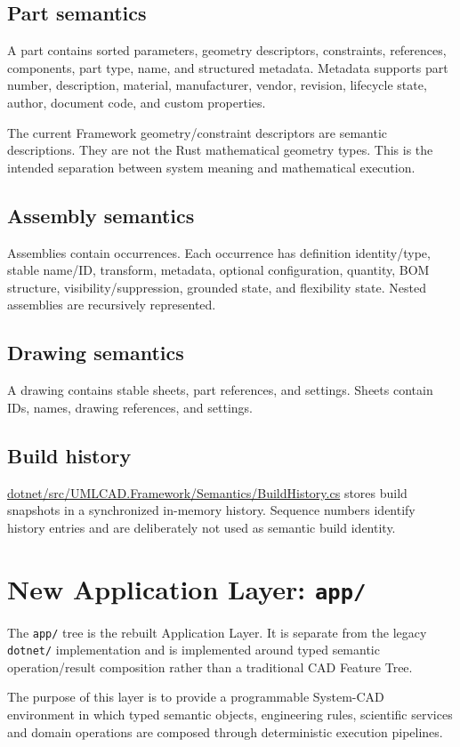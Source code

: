 \documentclass[11pt,a4paper]{report}
\newcommand{\pathref}[1]{\url{#1}}
\begin{document}
\section{Part semantics}
A part contains sorted parameters, geometry descriptors, constraints, references, components, part type, name, and structured metadata. Metadata supports part number, description, material, manufacturer, vendor, revision, lifecycle state, author, document code, and custom properties.

The current Framework geometry/constraint descriptors are semantic descriptions. They are not the Rust mathematical geometry types. This is the intended separation between system meaning and mathematical execution.

\section{Assembly semantics}
Assemblies contain occurrences. Each occurrence has definition identity/type, stable name/ID, transform, metadata, optional configuration, quantity, BOM structure, visibility/suppression, grounded state, and flexibility state. Nested assemblies are recursively represented.

\section{Drawing semantics}
A drawing contains stable sheets, part references, and settings. Sheets contain IDs, names, drawing references, and settings.

\section{Build history}
\pathref{dotnet/src/UMLCAD.Framework/Semantics/BuildHistory.cs} stores build snapshots in a synchronized in-memory history. Sequence numbers identify history entries and are deliberately not used as semantic build identity.

\chapter{New Application Layer: \texttt{app/}}

The \texttt{app/} tree is the rebuilt Application Layer. It is separate from the legacy \texttt{dotnet/} implementation and is implemented around typed semantic operation/result composition rather than a traditional CAD Feature Tree.

The purpose of this layer is to provide a programmable System-CAD environment in which typed semantic objects, engineering rules, scientific services and domain operations are composed through deterministic execution pipelines.
\end{document}
